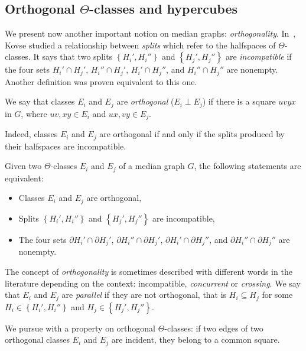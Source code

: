 \documentclass[a4paper,UKenglish,numberwithinsect,cleveref, autoref]{lipics-v2021}
\newcommand{\set}[1]{\left\{ #1 \right\}}
\begin{document}
\subsection{Orthogonal $\Theta$-classes and hypercubes} \label{asubsec:orthogonal}

We present now another important notion on median graphs: \textit{orthogonality}. In~\cite{Ko09}, Kovse studied a relationship between \textit{splits} which refer to the halfspaces of $\Theta$-classes. It says that two splits $\set{H_i',H_i''}$ and $\set{H_j',H_j''}$ are \textit{incompatible} if the four sets $H_i' \cap H_j'$, $H_i'' \cap H_j'$, $H_i' \cap H_j''$, and $H_i'' \cap H_j''$ are nonempty. Another definition was proven equivalent to this one.

\begin{definition}
We say that classes $E_i$ and $E_j$ are {\em orthogonal} ($E_i \perp E_j$) if there is a square $uvyx$ in $G$, where $uv,xy \in E_i$ and $ux,vy \in E_j$.
\end{definition}

Indeed, classes $E_i$ and $E_j$ are orthogonal if and only if the splits produced by their halfspaces are incompatible.

\begin{lemma} Given two $\Theta$-classes $E_i$ and $E_j$ of a median graph $G$, the following statements are equivalent:
\begin{itemize}
    \item Classes $E_i$ and $E_j$ are orthogonal,
    \item Splits $\set{H_i',H_i''}$ and $\set{H_j',H_j''}$ are incompatible,
    \item The four sets $\partial H_i' \cap \partial H_j'$, $\partial H_i'' \cap \partial H_j'$, $\partial H_i' \cap \partial H_j''$, and $\partial H_i'' \cap \partial H_j''$ are nonempty.
\end{itemize}
\label{le:perp_incomp}
\end{lemma}

The concept of \textit{orthogonality} is sometimes described with different words in the literature depending on the context: incompatible, \textit{concurrent} or \textit{crossing}. We say that $E_i$ and $E_j$ are \textit{parallel} if they are not orthogonal, that is $H_i \subseteq H_j$ for some $H_i \in \set{H_i',H_i''}$ and $H_j \in \set{H_j',H_j''}$. 

We pursue with a property on orthogonal $\Theta$-classes: if two edges of two orthogonal classes $E_i$ and $E_j$ are incident, they belong to a common square.
\end{document}
